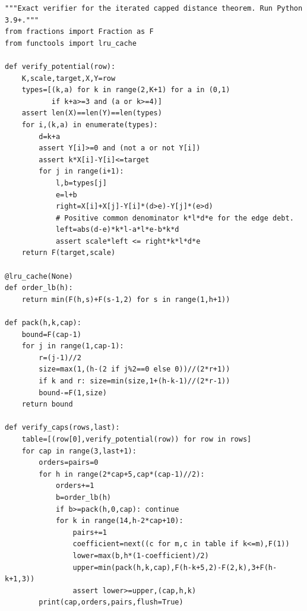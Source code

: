 \documentclass[11pt,a4paper]{article}
\begin{document}
\begin{Verbatim}[fontsize=\scriptsize]
"""Exact verifier for the iterated capped distance theorem. Run Python 3.9+."""
from fractions import Fraction as F
from functools import lru_cache

def verify_potential(row):
    K,scale,target,X,Y=row
    types=[(k,a) for k in range(2,K+1) for a in (0,1)
           if k+a>=3 and (a or k>=4)]
    assert len(X)==len(Y)==len(types)
    for i,(k,a) in enumerate(types):
        d=k+a
        assert Y[i]>=0 and (not a or not Y[i])
        assert k*X[i]-Y[i]<=target
        for j in range(i+1):
            l,b=types[j]
            e=l+b
            right=X[i]+X[j]-Y[i]*(d>e)-Y[j]*(e>d)
            # Positive common denominator k*l*d*e for the edge debt.
            left=abs(d-e)*k*l-a*l*e-b*k*d
            assert scale*left <= right*k*l*d*e
    return F(target,scale)

@lru_cache(None)
def order_lb(h):
    return min(F(h,s)+F(s-1,2) for s in range(1,h+1))

def pack(h,k,cap):
    bound=F(cap-1)
    for j in range(1,cap-1):
        r=(j-1)//2
        size=max(1,(h-(2 if j%2==0 else 0))//(2*r+1))
        if k and r: size=min(size,1+(h-k-1)//(2*r-1))
        bound-=F(1,size)
    return bound

def verify_caps(rows,last):
    table=[(row[0],verify_potential(row)) for row in rows]
    for cap in range(3,last+1):
        orders=pairs=0
        for h in range(2*cap+5,cap*(cap-1)//2):
            orders+=1
            b=order_lb(h)
            if b>=pack(h,0,cap): continue
            for k in range(14,h-2*cap+10):
                pairs+=1
                coefficient=next((c for m,c in table if k<=m),F(1))
                lower=max(b,h*(1-coefficient)/2)
                upper=min(pack(h,k,cap),F(h-k+5,2)-F(2,k),3+F(h-k+1,3))
                assert lower>=upper,(cap,h,k)
        print(cap,orders,pairs,flush=True)


\end{Verbatim}
\end{document}

